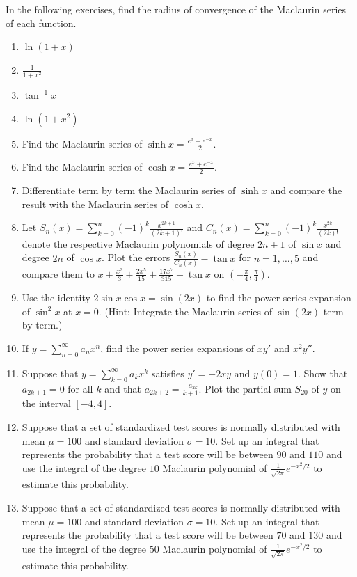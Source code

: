 \documentclass{exercises}
\begin{document}
In the following exercises, find the radius of convergence of the Maclaurin series of each function.

\begin{enumerate}[resume]
\item $\ln (1+x)$
\item $\frac{1}{1+x^{2}}$
\item $\tan^{-1}x$
\item $\ln (1+x^{2})$
\item Find the Maclaurin series of $\sinh x=\frac{e^{x}-e^{-x}}{2}$.
\item Find the Maclaurin series of $\cosh x=\frac{e^{x}+e^{-x}}{2}$.
\item Differentiate term by term the Maclaurin series of $\sinh x$ and compare the result with the Maclaurin series of $\cosh x$.
\item \techrequired Let $S_{n}(x)=\sum_{k=0}^{n}{(-1)}^{k}\frac{x^{2k+1}}{(2k+1)!}$ and $C_{n}(x)=\sum_{k=0}^{n}{(-1)}^{k}\frac{x^{2k}}{(2k)!}$ denote the respective Maclaurin polynomials of degree $2n+1$ of $\sin x$ and degree $2n$ of $\cos x$. Plot the errors $\frac{S_{n}(x)}{C_{n}(x)}-\tan x$ for $n=1,\ldots,5$ and compare them to $x+\frac{x^{3}}{3}+\frac{2x^{5}}{15}+\frac{17x^{7}}{315}-\tan x$ on $(-\frac{\pi}{4},\frac{\pi}{4})$.
\item Use the identity $2\sin x\cos x=\sin(2x)$ to find the power series expansion of $\sin^{2}x$ at $x=0$. (Hint: Integrate the Maclaurin series of $\sin(2x)$ term by term.)
\item If $y=\sum_{n=0}^{\infty}a_{n}x^{n}$, find the power series expansions of $xy'$ and $x^{2}y''$.
\item \techrequired Suppose that $y=\sum_{k=0}^{\infty}a_{k}x^{k}$ satisfies $y'=-2xy$ and $y(0)=1$. Show that $a_{2k+1}=0$ for all $k$ and that $a_{2k+2}=\frac{-a_{2k}}{k+1}$. Plot the partial sum $S_{20}$ of $y$ on the interval $[-4,4]$.
\item \techrequired Suppose that a set of standardized test scores is normally distributed with mean $\mu=100$ and standard deviation $\sigma=10$. Set up an integral that represents the probability that a test score will be between $90$ and $110$ and use the integral of the degree $10$ Maclaurin polynomial of $\frac{1}{\sqrt{2\pi}}e^{-x^{2}/2}$ to estimate this probability.
\item \techrequired Suppose that a set of standardized test scores is normally distributed with mean $\mu=100$ and standard deviation $\sigma=10$. Set up an integral that represents the probability that a test score will be between $70$ and $130$ and use the integral of the degree $50$ Maclaurin polynomial of $\frac{1}{\sqrt{2\pi}}e^{-x^{2}/2}$ to estimate this probability.

\end{enumerate}
\end{document}

